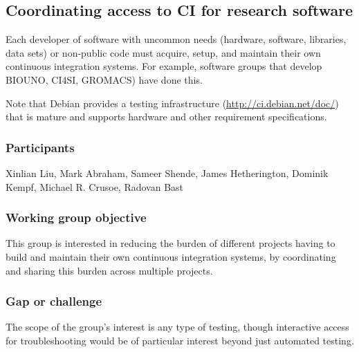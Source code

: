 \subsection{Coordinating access to CI for research software}
\label{sec:access}


Each developer of software with uncommon needs (hardware, software, libraries, data sets) or non-public code must acquire, setup, and maintain their own continuous integration systems.  For example, software groups that develop BIOUNO, CI4SI, GROMACS) have done this.  

Note that Debian provides a testing infrastructure (\href{https://ci.debian.net/doc/}{http://ci.debian.net/doc/}) that is mature and supports hardware and other requirement specifications. 



\subsubsection{Participants}

Xinlian Liu, Mark Abraham, Sameer Shende, James Hetherington, Dominik Kempf, Michael R. Crusoe, Radovan Bast

\subsubsection{Working group objective}

This group is interested in reducing the burden of different projects having to build and maintain their own continuous integration systems, by coordinating and sharing this burden across multiple projects.

\subsubsection{Gap or challenge}

The scope of the group's interest is any type of testing, though interactive access for troubleshooting would be of particular interest beyond just automated testing.

